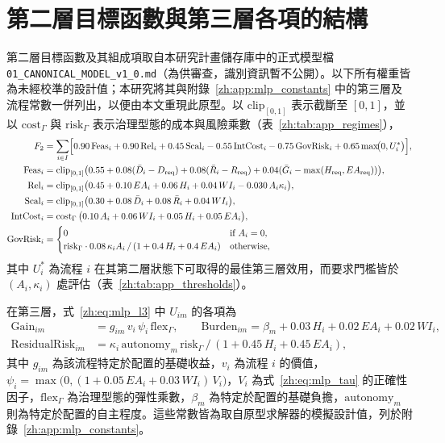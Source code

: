 \section{第二層目標函數與第三層各項的結構}

第二層目標函數及其組成項取自本研究計畫儲存庫中的正式模型檔 \texttt{01\_\allowbreak CANONICAL\_\allowbreak MODEL\_\allowbreak v1\_\allowbreak 0.md}（為供審查，識別資訊暫不公開）。以下所有權重皆為未經校準的設計值；本研究將其與附錄~\ref{zh:app:mlp_constants} 中的第三層及流程常數一併列出，以便由本文重現此原型。以 $\mathrm{clip}_{[0,1]}$ 表示截斷至 $[0,1]$，並以 $\mathrm{cost}_\Gamma$ 與 $\mathrm{risk}_\Gamma$ 表示治理型態的成本與風險乘數（表~\ref{zh:tab:app_regimes}），
\begin{align}
F_2 &= \sum_{i\in I}\Bigl[0.90\,\mathrm{Feas}_i+0.90\,\mathrm{Rel}_i+0.45\,\mathrm{Scal}_i-0.55\,\mathrm{IntCost}_i-0.75\,\mathrm{GovRisk}_i+0.65\max\!\bigl(0,U_i^{*}\bigr)\Bigr], \label{zh:eq:app_f2}\\
\mathrm{Feas}_i &= \mathrm{clip}_{[0,1]}\bigl(0.55+0.08(\bar D_i-D_{\mathrm{req}})+0.08(\bar R_i-R_{\mathrm{req}})+0.04(\bar G_i-\max(H_{\mathrm{req}},EA_{\mathrm{req}}))\bigr), \nonumber\\
\mathrm{Rel}_i &= \mathrm{clip}_{[0,1]}\bigl(0.45+0.10\,EA_i+0.06\,H_i+0.04\,WI_i-0.030\,A_i\kappa_i\bigr), \nonumber\\
\mathrm{Scal}_i &= \mathrm{clip}_{[0,1]}\bigl(0.30+0.08\,\bar D_i+0.08\,\bar R_i+0.04\,WI_i\bigr), \nonumber\\
\mathrm{IntCost}_i &= \mathrm{cost}_\Gamma\,\bigl(0.10\,A_i+0.06\,WI_i+0.05\,H_i+0.05\,EA_i\bigr), \nonumber\\
\mathrm{GovRisk}_i &= \begin{cases} 0 & \text{if } A_i=0,\\ \mathrm{risk}_\Gamma\cdot 0.08\,\kappa_i A_i\,/\,(1+0.4\,H_i+0.4\,EA_i) & \text{otherwise,}\end{cases} \nonumber
\end{align}
其中 $U_i^{*}$ 為流程 $i$ 在其第二層狀態下可取得的最佳第三層效用，而要求門檻皆於 $(A_i,\kappa_i)$ 處評估（表~\ref{zh:tab:app_thresholds}）。

在第三層，式~\eqref{zh:eq:mlp_l3} 中 $U_{im}$ 的各項為
\begin{align}
\mathrm{Gain}_{im} &= g_{im}\,v_i\,\psi_i\,\mathrm{flex}_\Gamma, \qquad \mathrm{Burden}_{im} = \beta_m+0.03\,H_i+0.02\,EA_i+0.02\,WI_i, \nonumber\\
\mathrm{ResidualRisk}_{im} &= \kappa_i\,\mathrm{autonomy}_m\,\mathrm{risk}_\Gamma\,/\,(1+0.45\,H_i+0.45\,EA_i), \nonumber
\end{align}
其中 $g_{im}$ 為該流程特定於配置的基礎收益，$v_i$ 為流程 $i$ 的價值，$\psi_i=\max\bigl(0,(1+0.05\,EA_i+0.03\,WI_i)\,V_i\bigr)$，$V_i$ 為式~\eqref{zh:eq:mlp_tau} 的正確性因子，$\mathrm{flex}_\Gamma$ 為治理型態的彈性乘數，$\beta_m$ 為特定於配置的基礎負擔，$\mathrm{autonomy}_m$ 則為特定於配置的自主程度。這些常數皆為取自原型求解器的模擬設計值，列於附錄~\ref{zh:app:mlp_constants}。


